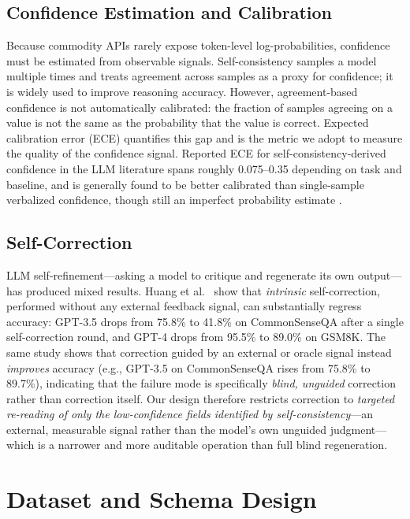 \documentclass[conference]{IEEEtran}
\begin{document}
\subsection{Confidence Estimation and Calibration}
Because commodity APIs rarely expose token-level log-probabilities, confidence must be estimated from observable signals. Self-consistency \cite{b5} samples a model multiple times and treats agreement across samples as a proxy for confidence; it is widely used to improve reasoning accuracy. However, agreement-based confidence is not automatically calibrated: the fraction of samples agreeing on a value is not the same as the probability that the value is correct. Expected calibration error (ECE) \cite{b6} quantifies this gap and is the metric we adopt to measure the quality of the confidence signal. Reported ECE for self-consistency-derived confidence in the LLM literature spans roughly 0.075--0.35 depending on task and baseline, and is generally found to be better calibrated than single-sample verbalized confidence, though still an imperfect probability estimate \cite{b11}.

\subsection{Self-Correction}
LLM self-refinement---asking a model to critique and regenerate its own output---has produced mixed results. Huang et al.\ \cite{b3} show that \emph{intrinsic} self-correction, performed without any external feedback signal, can substantially regress accuracy: GPT-3.5 drops from 75.8\% to 41.8\% on CommonSenseQA after a single self-correction round, and GPT-4 drops from 95.5\% to 89.0\% on GSM8K. The same study shows that correction guided by an external or oracle signal instead \emph{improves} accuracy (e.g., GPT-3.5 on CommonSenseQA rises from 75.8\% to 89.7\%), indicating that the failure mode is specifically \emph{blind, unguided} correction rather than correction itself. Our design therefore restricts correction to \emph{targeted re-reading of only the low-confidence fields identified by self-consistency}---an external, measurable signal rather than the model's own unguided judgment---which is a narrower and more auditable operation than full blind regeneration.

\section{Dataset and Schema Design}
\label{sec:data}
\end{document}

